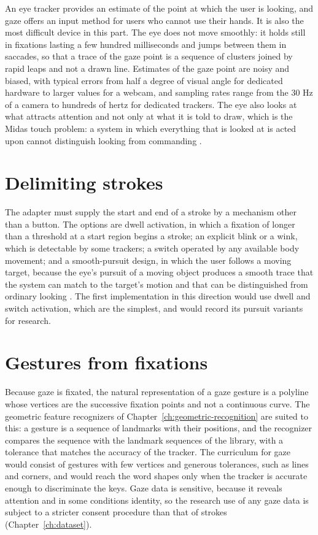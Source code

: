 An eye tracker provides an estimate of the point at which the user is looking, and gaze offers an input method for users who cannot use their hands. It is also the most difficult device in this part. The eye does not move smoothly: it holds still in fixations lasting a few hundred milliseconds and jumps between them in saccades, so that a trace of the gaze point is a sequence of clusters joined by rapid leaps and not a drawn line. Estimates of the gaze point are noisy and biased, with typical errors from half a degree of visual angle for dedicated hardware to larger values for a webcam, and sampling rates range from the 30 Hz of a camera to hundreds of hertz for dedicated trackers. The eye also looks at what attracts attention and not only at what it is told to draw, which is the Midas touch problem: a system in which everything that is looked at is acted upon cannot distinguish looking from commanding \cite{jacob1990}.\evD{}

\section{Delimiting strokes}

The adapter must supply the start and end of a stroke by a mechanism other than a button. The options are dwell activation, in which a fixation of longer than a threshold at a start region begins a stroke; an explicit blink or a wink, which is detectable by some trackers; a switch operated by any available body movement; and a smooth-pursuit design, in which the user follows a moving target, because the eye's pursuit of a moving object produces a smooth trace that the system can match to the target's motion and that can be distinguished from ordinary looking \cite{vidal2013}.\evD{} The first implementation in this direction would use dwell and switch activation, which are the simplest, and would record its pursuit variants for research.

\section{Gestures from fixations}

Because gaze is fixated, the natural representation of a gaze gesture is a polyline whose vertices are the successive fixation points and not a continuous curve. The geometric feature recognizers of Chapter~\ref{ch:geometric-recognition} are suited to this: a gesture is a sequence of landmarks with their positions, and the recognizer compares the sequence with the landmark sequences of the library, with a tolerance that matches the accuracy of the tracker. The curriculum for gaze would consist of gestures with few vertices and generous tolerances, such as lines and corners, and would reach the word shapes only when the tracker is accurate enough to discriminate the keys. Gaze data is sensitive, because it reveals attention and in some conditions identity, so the research use of any gaze data is subject to a stricter consent procedure than that of strokes (Chapter~\ref{ch:dataset}).

